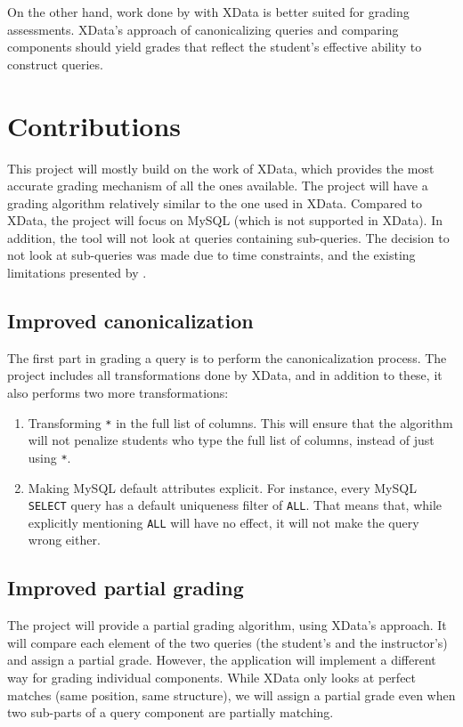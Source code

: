 On the other hand, work done by \cite{literature:xdata} with XData is better suited for grading assessments. XData's approach of canonicalizing queries and comparing components should yield grades that reflect the student's effective ability to construct queries.

\section{Contributions}

This project will mostly build on the work of XData, which provides the most accurate grading mechanism of all the ones available. The project will have a grading algorithm relatively similar to the one used in XData. Compared to XData, the project will focus on MySQL (which is not supported in XData). In addition, the tool will not look at queries containing sub-queries. The decision to not look at sub-queries was made due to time constraints, and the existing limitations presented by \cite{literature:xdata}.

\subsection{Improved canonicalization} \label{ch:lit:sec:improved_canon}

The first part in grading a query is to perform the canonicalization process. The project includes all transformations done by XData, and in addition to these, it also performs two more transformations:
\begin{enumerate}
    \item Transforming \texttt{*} in the full list of columns. This will ensure that the algorithm will not penalize students who type the full list of columns, instead of just using  \texttt{*}.
    \item Making MySQL default attributes explicit. For instance, every MySQL \texttt{SELECT} query has a default uniqueness filter of \texttt{ALL}. That means that, while explicitly mentioning \texttt{ALL} will have no effect, it will not make the query wrong either.
\end{enumerate}

\subsection{Improved partial grading} \label{ch:lit:sec:improved_grading}

The project will provide a partial grading algorithm, using XData's approach. It will compare each element of the two queries (the student's and the instructor's) and assign a partial grade. However, the application will implement a different way for grading individual components. While XData only looks at perfect matches (same position, same structure), we will assign a partial grade even when two sub-parts of a query component are partially matching.

